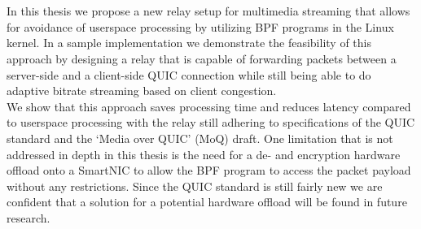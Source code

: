 \chapter{\abstractname}
In this thesis we propose a new relay setup for multimedia streaming that allows
for avoidance of userspace processing by utilizing BPF programs in the Linux kernel.
In a sample implementation we demonstrate the feasibility of this approach by
designing a relay that is capable of forwarding packets between a server-side 
and a client-side QUIC connection while still being able to do adaptive bitrate
streaming based on client congestion.
\\
We show that this approach saves processing time and reduces latency compared to
userspace processing with the relay still adhering to specifications of the QUIC
standard and the `Media over QUIC' (MoQ) draft.
One limitation that is not addressed in depth in this thesis is the need for a
de- and encryption hardware offload onto a SmartNIC to allow the BPF program to access
the packet payload without any restrictions.
Since the QUIC standard is still fairly new we are confident that a solution for a
potential hardware offload will be found in future research.